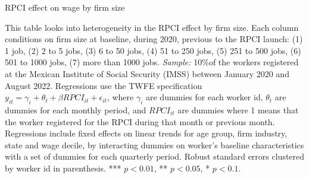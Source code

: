 \documentclass[oneside,11pt]{article}
\begin{document}
\begin{landscape}

\begin{table}[H]
    \caption{RPCI effect on wage by firm size}
    \label{twfe_wage_hetero_firm_size}
    \begin{center}
    \scriptsize{}
    \end{center}
\end{table}
\scriptsize{
\noindent This table looks into heterogeneity in the RPCI effect by firm size. Each column conditions on firm size at baseline, during 2020, previous to the RPCI launch: (1) 1 job, (2) 2 to 5 jobs, (3) 6 to 50 jobs, (4) 51 to 250 jobs, (5) 251 to 500 jobs, (6) 501 to 1000 jobs, (7) more than 1000 jobs. \textit{Sample:} 10\%of the workers registered at the Mexican Institute of Social Security (IMSS) between January 2020 and August 2022. Regressions use the TWFE specification $y_{it} = \gamma_{i} + \theta_{t}+ \beta RPCI_{it} +\epsilon_{it}$, where $\gamma_{i}$ are dummies for each worker id, $\theta_{t}$ are dummies for each monthly period, and $RPCI_{it}$ are dummies where 1 means that the worker registered for the RPCI during that month or previous month. Regressions include fixed effects on linear trends for age group, firm industry, state and wage decile, by interacting dummies on worker's baseline characteristics with a set of dummies for each quarterly period. Robust standard errors clustered by worker id in parenthesis. *** $p<0.01$, ** $p<0.05$, * $p<0.1$.
}

\end{landscape}

\clearpage
\end{document}
